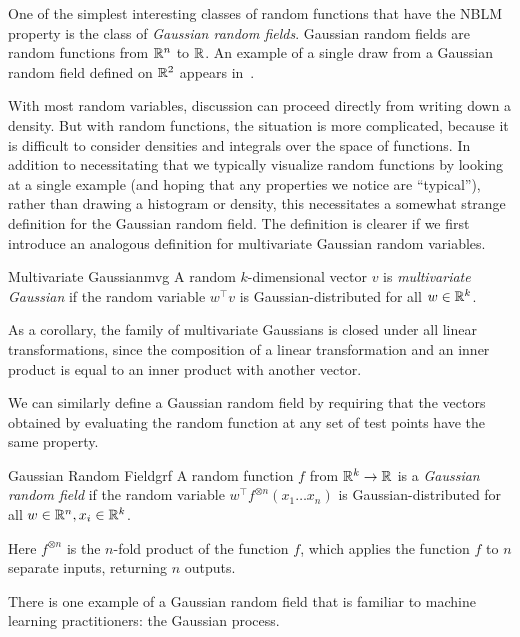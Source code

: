 \documentclass[../../thesis.tex]{subfiles}
\begin{document}
One of the simplest interesting classes of random functions
that have the NBLM property is the class of
\emph{Gaussian random fields}.
Gaussian random fields are random functions
from $\mathbb{R}^n$ to $\mathbb{R}$.
An example of a single draw from a Gaussian random field defined on $\mathbb{R}^2$
appears in~.

With most random variables,
discussion can proceed directly from writing down a density.
But with random functions,
the situation is more complicated,
because it is difficult to consider densities and integrals over
the space of functions.
In addition to necessitating that we typically visualize random functions
by looking at a single example
(and hoping that any properties we notice are \enquote{typical}),
rather than drawing a histogram or density,
this necessitates a somewhat strange definition for the Gaussian random field.
The definition is clearer if we first introduce an analogous definition
for multivariate Gaussian random variables.

\begin{definition}{Multivariate Gaussian}{mvg}
	A random $k$-dimensional vector $v$ is \emph{multivariate Gaussian} if
	the random variable $w^\top v$ is Gaussian-distributed
	for all $w\in\mathbb{R}^k$.
\end{definition}
As a corollary,
the family of multivariate Gaussians is closed under all linear transformations,
since the composition of a linear transformation and an inner product
is equal to an inner product with another vector.

We can similarly define a Gaussian random field
by requiring that the vectors obtained by
evaluating the random function at any set of test points
have the same property.
\begin{definition}{Gaussian Random Field}{grf}
	A random function $f$ from $\mathbb{R}^k\to\mathbb{R}$ is a \emph{Gaussian random field}
	if the random variable $w^\top f^{\otimes n}(x_1 \dots x_n)$
	is Gaussian-distributed
	for all $w\in\mathbb{R}^n, x_i \in\mathbb{R}^k$.
\end{definition}
Here $f^{\otimes n}$ is the $n$-fold product of the function $f$,
which applies the function $f$ to $n$ separate inputs,
returning $n$ outputs.

There is one example of a Gaussian random field
that is familiar to machine learning practitioners:
the Gaussian process.
\end{document}
